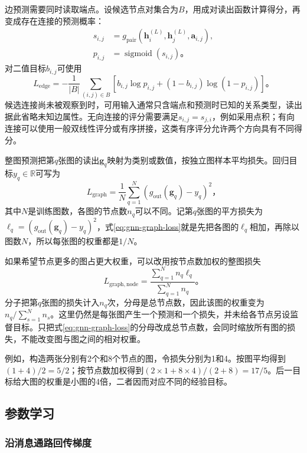 边预测需要同时读取端点。设候选节点对集合为$B$，用成对读出函数计算得分，再变成存在连接的预测概率：
\[
  \begin{aligned}
    s_{i,j}&=g_{\mathrm{pair}}(\bm{h}_i^{(L)},\bm{h}_j^{(L)},\bm{a}_{i,j}),\\
    p_{i,j}&=\operatorname{sigmoid}(s_{i,j})\text{。}
  \end{aligned}
\]
对二值目标$b_{i,j}$可使用
\begin{equation}
  L_{\mathrm{edge}}=-\frac{1}{|B|}\sum_{(i,j)\in B}
    \left[b_{i,j}\log p_{i,j}+(1-b_{i,j})\log(1-p_{i,j})\right]\text{。}
  \label{eq:gnn-edge-loss}
\end{equation}
候选连接尚未被观察到时，可用输入通常只含端点和预测时已知的关系类型，读出据此省略未知边属性。无向连接的评分需要满足$s_{i,j}=s_{j,i}$，例如采用点积；有向连接可以使用一般双线性评分或有序拼接，这类有序评分允许两个方向具有不同得分。

整图预测把第$q$张图的读出$\bm{g}_q$映射为类别或数值，按独立图样本平均损失。回归目标$y_q\in\mathbb{R}$可写为
\begin{equation}
  L_{\mathrm{graph}}=\frac{1}{N}\sum_{q=1}^{N}
    \left(g_{\mathrm{out}}(\bm{g}_q)-y_q\right)^2\text{，}
  \label{eq:gnn-graph-loss}
\end{equation}
其中$N$是训练图数，各图的节点数$n_q$可以不同。记第$q$张图的平方损失为$\ell_q=(g_{\mathrm{out}}(\bm{g}_q)-y_q)^2$，式\eqref{eq:gnn-graph-loss}就是先把各图的$\ell_q$相加，再除以图数$N$，所以每张图的权重都是$1/N$。

如果希望节点更多的图占更大权重，可以改用按节点数加权的整图损失
\[
  L_{\mathrm{graph,node}}=
    \frac{\sum_{q=1}^{N}n_q\ell_q}{\sum_{q=1}^{N}n_q}\text{。}
\]
分子把第$q$张图的损失计入$n_q$次，分母是总节点数，因此该图的权重变为$n_q/\sum_{s=1}^{N}n_s$。这里仍然是每张图产生一个预测和一个损失，并未给各节点另设监督目标。只把式\eqref{eq:gnn-graph-loss}的分母改成总节点数，会同时缩放所有图的损失，不能改变图与图之间的相对权重。

例如，构造两张分别有2个和8个节点的图，令损失分别为1和4。按图平均得到$(1+4)/2=5/2$；按节点数加权得到$(2\times1+8\times4)/(2+8)=17/5$。后一目标给大图的权重是小图的4倍，二者因而对应不同的经验目标。

\subsection{参数学习}
\label{sec:gnn-learning}

\subsubsection{沿消息通路回传梯度}
\label{sec:gnn-message-backprop}

